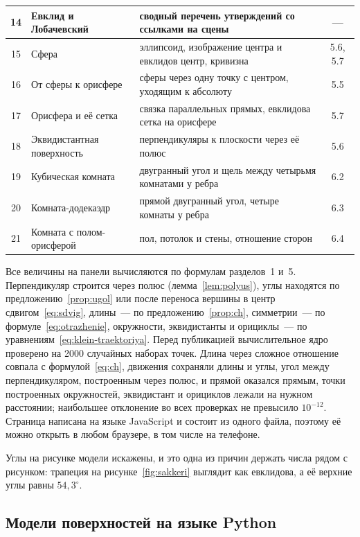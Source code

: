 \begin{table}[H]
\begin{tabular}{|c|>{\raggedright\arraybackslash}p{5.4cm}|>{\raggedright\arraybackslash}p{6.6cm}|c|}
14 & Евклид и Лобачевский & сводный перечень утверждений со ссылками на сцены & --- \\ \hline
15 & Сфера & эллипсоид, изображение центра и евклидов центр, кривизна & 5.6, 5.7 \\ \hline
16 & От сферы к орисфере & сферы через одну точку с центром, уходящим к абсолюту & 5.5 \\ \hline
17 & Орисфера и её сетка & связка параллельных прямых, евклидова сетка на орисфере & 5.7 \\ \hline
18 & Эквидистантная поверхность & перпендикуляры к плоскости через её полюс & 5.6 \\ \hline
19 & Кубическая комната & двугранный угол и щель между четырьмя комнатами у ребра & 6.2 \\ \hline
20 & Комната-додекаэдр & прямой двугранный угол, четыре комнаты у ребра & 6.3 \\ \hline
21 & Комната с полом-орисферой & пол, потолок и стены, отношение сторон & 6.4 \\ \hline
\end{tabular}
\end{table}

Все величины на панели вычисляются по формулам разделов~1 и~5. Перпендикуляр строится через полюс (лемма~\ref{lem:polyus}), углы находятся по предложению~\ref{prop:ugol} или после переноса вершины в центр сдвигом~\eqref{eq:sdvig}, длины~--- по предложению~\ref{prop:ch}, симметрии~--- по формуле~\eqref{eq:otrazhenie}, окружности, эквидистанты и орициклы~--- по уравнениям~\eqref{eq:klein-traektoriya}. Перед публикацией вычислительное ядро проверено на 2000 случайных наборах точек. Длина через сложное отношение совпала с формулой~\eqref{eq:ch}, движения сохраняли длины и углы, угол между перпендикуляром, построенным через полюс, и прямой оказался прямым, точки построенных окружностей, эквидистант и орициклов лежали на нужном расстоянии; наибольшее отклонение во всех проверках не превысило $10^{-12}$. Страница написана на языке JavaScript и состоит из одного файла, поэтому её можно открыть в любом браузере, в том числе на телефоне.

Углы на рисунке модели искажены, и это одна из причин держать числа рядом с рисунком: трапеция на рисунке~\ref{fig:sakkeri} выглядит как евклидова, а её верхние углы равны $54{,}3^\circ$.

\subsection{Модели поверхностей на языке Python}

